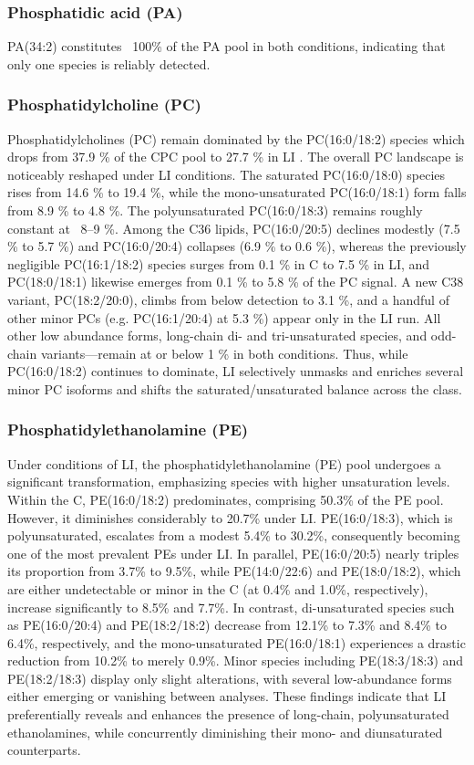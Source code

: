 \documentclass[10pt,letterpaper]{article}
\begin{document}
\begin{itemize}
\subsubsection*{Phosphatidic acid (PA)} 
PA(34:2) constitutes ~100\% of the PA pool in both conditions, indicating that only one species is reliably detected.

\subsubsection*{Phosphatidylcholine (PC)} 
Phosphatidylcholines (PC) remain dominated by the PC(16:0/18:2) species which drops from 37.9 \% of the CPC pool to 27.7 \% in LI . The overall PC landscape is noticeably reshaped under LI conditions. The saturated PC(16:0/18:0) species rises from 14.6 \% to 19.4 \%, while the mono-unsaturated PC(16:0/18:1) form falls from 8.9 \% to 4.8 \%. The polyunsaturated PC(16:0/18:3) remains roughly constant at ~8–9 \%. Among the C36 lipids, PC(16:0/20:5) declines modestly (7.5 \% to 5.7 \%) and PC(16:0/20:4) collapses (6.9 \% to 0.6 \%), whereas the previously negligible PC(16:1/18:2) species surges from 0.1 \% in C to 7.5 \% in LI, and PC(18:0/18:1) likewise emerges from 0.1 \% to 5.8 \% of the PC signal. A new C38 variant, PC(18:2/20:0), climbs from below detection to 3.1 \%, and a handful of other minor PCs (e.g. PC(16:1/20:4) at 5.3 \%) appear only in the LI run. All other low abundance forms, long-chain di- and tri-unsaturated species, and odd-chain variants—remain at or below 1 \% in both conditions. Thus, while PC(16:0/18:2) continues to dominate, LI selectively unmasks and enriches several minor PC isoforms and shifts the saturated/unsaturated balance across the class.

\subsubsection*{Phosphatidylethanolamine (PE)} 
Under conditions of LI, the phosphatidylethanolamine (PE) pool undergoes a significant transformation, emphasizing species with higher unsaturation levels. Within the C, PE(16:0/18:2) predominates, comprising 50.3\% of the PE pool. However, it diminishes considerably to 20.7\% under LI. PE(16:0/18:3), which is polyunsaturated, escalates from a modest 5.4\% to 30.2\%, consequently becoming one of the most prevalent PEs under LI. In parallel, PE(16:0/20:5) nearly triples its proportion from 3.7\% to 9.5\%, while PE(14:0/22:6) and PE(18:0/18:2), which are either undetectable or minor in the C (at 0.4\% and 1.0\%, respectively), increase significantly to 8.5\% and 7.7\%. In contrast, di-unsaturated species such as PE(16:0/20:4) and PE(18:2/18:2) decrease from 12.1\% to 7.3\% and 8.4\% to 6.4\%, respectively, and the mono-unsaturated PE(16:0/18:1) experiences a drastic reduction from 10.2\% to merely 0.9\%. Minor species including PE(18:3/18:3) and PE(18:2/18:3) display only slight alterations, with several low-abundance forms either emerging or vanishing between analyses. These findings indicate that LI preferentially reveals and enhances the presence of long-chain, polyunsaturated ethanolamines, while concurrently diminishing their mono- and diunsaturated counterparts.


\end{itemize}
\end{document}
